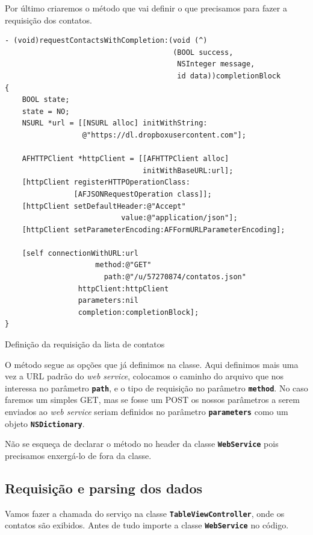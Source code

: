 \documentclass[a4paper,12pt,brazil,doubleside]{book}
\begin{document}
\begin{singlespace}
Por último criaremos o método que vai definir o que precisamos para fazer a requisição dos contatos.

\begin{listing}[H]
\begin{verbatim}
- (void)requestContactsWithCompletion:(void (^)
                                       (BOOL success,
                                        NSInteger message,
                                        id data))completionBlock
{
    BOOL state;
    state = NO;
    NSURL *url = [[NSURL alloc] initWithString:
                  @"https://dl.dropboxusercontent.com"];
    
    AFHTTPClient *httpClient = [[AFHTTPClient alloc]
                                initWithBaseURL:url];
    [httpClient registerHTTPOperationClass:
                [AFJSONRequestOperation class]];
    [httpClient setDefaultHeader:@"Accept"
                           value:@"application/json"];
    [httpClient setParameterEncoding:AFFormURLParameterEncoding];
    
    [self connectionWithURL:url
                     method:@"GET"
                       path:@"/u/57270874/contatos.json"
                 httpClient:httpClient
                 parameters:nil
                 completion:completionBlock];
}
\end{verbatim}
\caption{Definição da requisição da lista de contatos}
\end{listing}


O método segue as opções que já definimos na classe. Aqui definimos mais uma vez a URL padrão do \emph{web service}, colocamos o caminho do arquivo que nos interessa no parâmetro \texttt{\textbf{path}}, e o tipo de requisição no parâmetro \texttt{\textbf{method}}. No caso faremos um simples GET, mas se fosse um POST os nossos parâmetros a serem enviados ao \emph{web service} seriam definidos no parâmetro \texttt{\textbf{parameters}} como um objeto  \texttt{\textbf{NSDictionary}}.

Não se esqueça de declarar o método no header da classe \texttt{\textbf{WebService}} pois precisamos enxergá-lo de fora da classe.

\subsection{Requisição e parsing dos dados}


Vamos fazer a chamada do serviço na classe \texttt{\textbf{TableViewController}}, onde os contatos são exibidos. Antes de tudo importe a classe \texttt{\textbf{WebService}} no código.


\end{singlespace}
\end{document}
